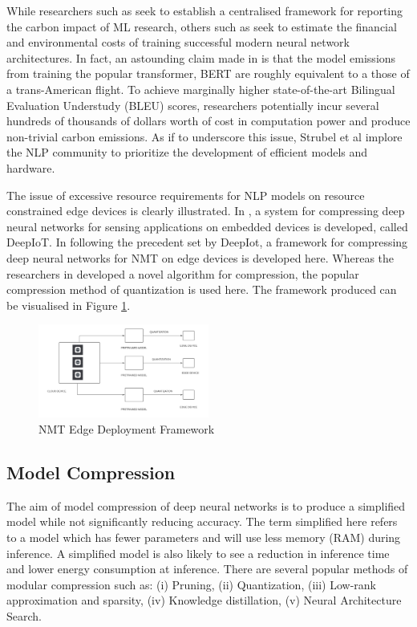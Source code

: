 \documentclass{sigchi}
\begin{document}
\par While researchers such as \cite{systematic} seek to establish a centralised framework for reporting the carbon impact of ML research, others such as \cite{energypolicy} seek to estimate the financial and environmental costs of training successful modern neural network architectures. In fact, an astounding claim made in \cite{energypolicy} is that the model emissions from training the popular transformer, BERT \cite{bert} are roughly equivalent to a those of a trans-American flight. To achieve marginally higher state-of-the-art Bilingual Evaluation Understudy (BLEU) \cite{bleu} scores, researchers potentially incur several hundreds of thousands of dollars worth of cost in computation power and produce non-trivial carbon emissions. As if to underscore this issue, Strubel et al \cite{energypolicy} implore the NLP community to prioritize the development of efficient models and hardware. 

\par The issue of excessive resource requirements for NLP models on resource constrained edge devices is clearly illustrated. In \cite{nnembedded}, a system for compressing deep neural networks for sensing applications on embedded devices is developed, called DeepIoT.
In following the precedent set by DeepIot, a framework for compressing deep neural networks for NMT on edge devices is developed here. Whereas the researchers in \cite{edgeml} developed a novel algorithm for compression, the popular compression method of quantization is used here. The framework produced can be visualised in Figure \ref{fig:nmtedge}.


\begin{figure}[t]
\centering
\includegraphics[width=0.5\textwidth]{figures/nmt_edge.png}
\caption{NMT Edge Deployment Framework}
\label{fig:nmtedge}
\end{figure}


\subsection{Model Compression}
The aim of model compression of deep neural networks is to produce a simplified model while not significantly reducing accuracy. The term simplified here refers to a model which has fewer parameters and will use less memory (RAM) during inference. A simplified model is also likely to see a reduction in inference time and lower energy consumption at inference. There are several popular methods of modular compression such as: (i) Pruning, (ii) Quantization, (iii) Low-rank approximation and sparsity, (iv) Knowledge distillation, (v) Neural Architecture Search. 
\end{document}
